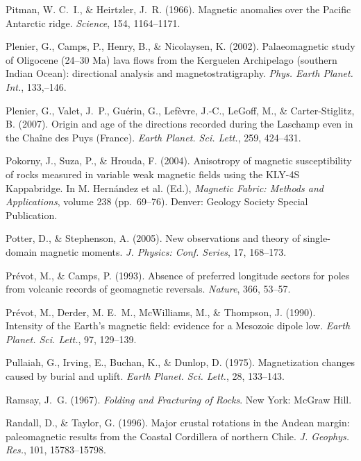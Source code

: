 \documentclass[,plain]{tauxe}
\begin{document}
\begin{thebibliography}{}
\bibitem{}%
Pitman, W. C.~I., \& Heirtzler, J.~R. (1966).
Magnetic anomalies over the Pacific Antarctic ridge.
{\it Science}, 154, 1164--1171.

\bibitem{}%
Plenier, G., Camps, P., Henry, B., \& Nicolaysen, K. (2002).
Palaeomagnetic study of Oligocene (24--30 Ma) lava flows from the Kerguelen Archipelago (southern Indian Ocean): directional analysis and magnetostratigraphy.
{\it Phys. Earth Planet. Int.}, 133,--146.

\bibitem{}%
Plenier, G., Valet, J.~P., Gu\'erin, G., Lef\`evre, J.-C., LeGoff, M., \& Carter-Stiglitz, B. (2007).
Origin and age of the directions recorded during the Laschamp even in the Cha\^ine des Puys (France).
{\it Earth Planet. Sci. Lett.}, 259, 424--431.

\bibitem{}%
Pokorny, J., Suza, P., \& Hrouda, F. (2004).
Anisotropy of magnetic susceptibility of rocks measured in variable weak magnetic fields using the KLY-4S Kappabridge.
In M. Hern{\'{a}}ndez et al. (Ed.), {\it Magnetic Fabric: Methods and
Applications}, volume 238 (pp.~69--76). Denver: Geology Society Special Publication.

\bibitem{}%
Potter, D., \& Stephenson, A. (2005).
New observations and theory of single-domain magnetic moments.
{\it J. Physics: Conf. Series}, 17, 168--173.

\bibitem{}%
Pr\'evot, M., \& Camps, P. (1993).
Absence of preferred longitude sectors for poles from volcanic records of geomagnetic reversals.
{\it Nature}, 366, 53--57.

\bibitem{}%
Pr\'evot, M., Derder, M. E.~M., McWilliams, M., \& Thompson, J. (1990).
Intensity of the Earth's magnetic field: evidence for a Mesozoic dipole low.
{\it Earth Planet. Sci. Lett.}, 97, 129--139.

\bibitem{}%
Pullaiah, G., Irving, E., Buchan, K., \& Dunlop, D. (1975).
Magnetization changes caused by burial and uplift.
{\it Earth Planet. Sci. Lett.}, 28, 133--143.

\bibitem{}%
Ramsay, J.~G. (1967).
{\it Folding and Fracturing of Rocks}.
New York: McGraw Hill.

\bibitem{}%
Randall, D., \& Taylor, G. (1996).
Major crustal rotations in the Andean margin: paleomagnetic results from the Coastal Cordillera of northern Chile.
{\it J. Geophys. Res.}, 101, 15783--15798.


\end{thebibliography}
\end{document}
